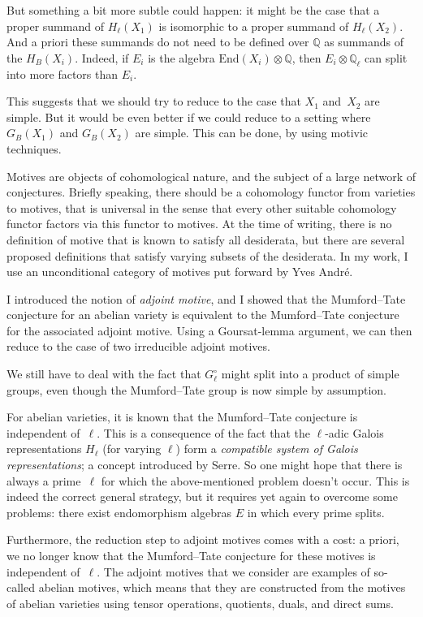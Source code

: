 But something a bit more subtle could happen:
it might be the case that a proper summand of $H_\ell(X_1)$ is isomorphic to a proper summand of $H_\ell(X_2)$.
And a priori these summands do not need to be defined over $\mathbb Q$ as summands of the $H_B(X_i)$.
Indeed, if $E_i$ is the algebra $\text{End}(X_i) \otimes \mathbb Q$,
then $E_i \otimes \mathbb Q_\ell$ can split into more factors than $E_i$.

This suggests that we should try to reduce to the case that $X_1$ and~$X_2$ are simple.
But it would be even better if we could reduce to a setting where $G_B(X_1)$ and $G_B(X_2)$ are simple.
This can be done, by using motivic techniques.

Motives are objects of cohomological nature, and the subject of a large network of conjectures.
Briefly speaking, there should be a cohomology functor from varieties to motives,
that is universal in the sense that every other suitable cohomology functor factors via this functor to motives.
At the time of writing, there is no definition of motive that is known to satisfy all desiderata,
but there are several proposed definitions that satisfy varying subsets of the desiderata.
In my work, I use an unconditional category of motives put forward by Yves Andr\'e.

I introduced the notion of \emph{adjoint motive},
and I showed that the Mumford--Tate conjecture for an abelian variety
is equivalent to the Mumford--Tate conjecture for the associated adjoint motive.
Using a Goursat-lemma argument,
we can then reduce to the case of two irreducible adjoint motives.

We still have to deal with the fact that $G_\ell^\circ$ might split into a product of simple groups,
even though the Mumford--Tate group is now simple by assumption.

For abelian varieties, it is known that the Mumford--Tate conjecture is independent of~$\ell$.
This is a consequence of the fact that
the $\ell$-adic Galois representations $H_\ell$ (for varying $\ell$)
form a \emph{compatible system of Galois representations};
a concept introduced by Serre.
So one might hope that there is always a prime~$\ell$ for which the above-mentioned problem doesn't occur.
This is indeed the correct general strategy,
but it requires yet again to overcome some problems:
there exist endomorphism algebras $E$ in which every prime splits.

Furthermore, the reduction step to adjoint motives comes with a cost:
a priori, we no longer know that the Mumford--Tate conjecture for these motives is independent of~$\ell$.
The adjoint motives that we consider are examples of so-called abelian motives,
which means that they are constructed from the motives of abelian varieties using tensor operations, quotients, duals, and direct sums.

